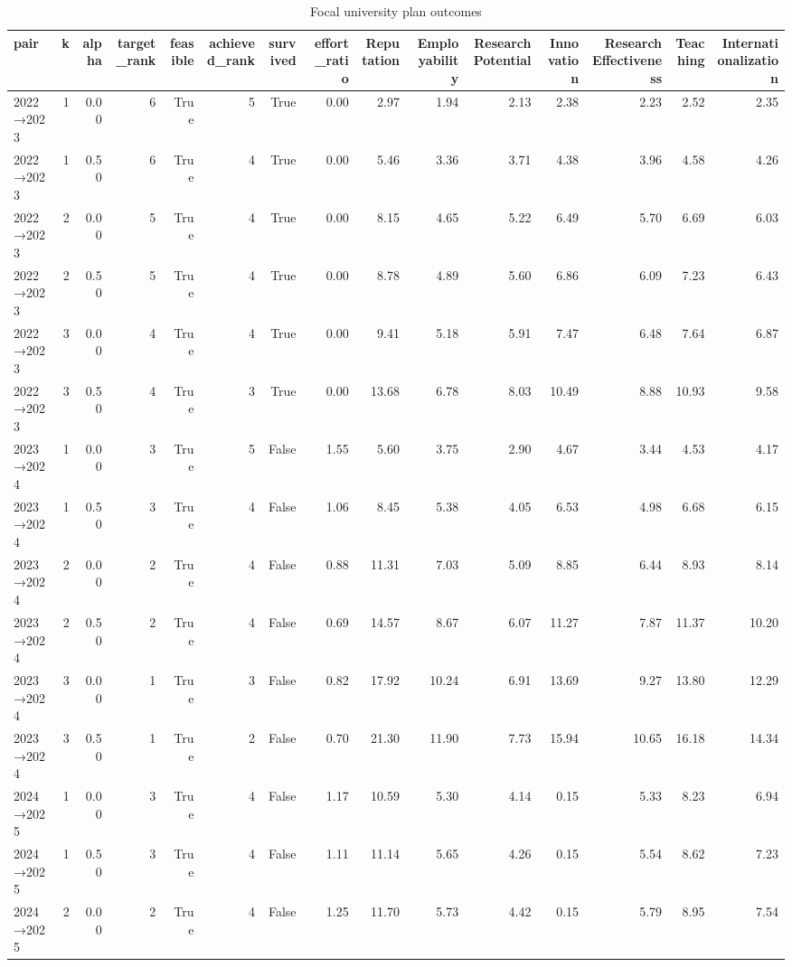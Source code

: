 \begin{table}[htbp]
\centering
\caption{Focal university plan outcomes}
\label{tab:e2-focal}
\begin{tabular}{lrrrrrrrrrrrrrr}
\toprule
pair & k & alpha & target\_rank & feasible & achieved\_rank & survived & effort\_ratio & Reputation & Employability & Research Potential & Innovation & Research Effectiveness & Teaching & Internationalization \\
\midrule
2022→2023 & 1 & 0.00 & 6 & True & 5 & True & 0.00 & 2.97 & 1.94 & 2.13 & 2.38 & 2.23 & 2.52 & 2.35 \\
2022→2023 & 1 & 0.50 & 6 & True & 4 & True & 0.00 & 5.46 & 3.36 & 3.71 & 4.38 & 3.96 & 4.58 & 4.26 \\
2022→2023 & 2 & 0.00 & 5 & True & 4 & True & 0.00 & 8.15 & 4.65 & 5.22 & 6.49 & 5.70 & 6.69 & 6.03 \\
2022→2023 & 2 & 0.50 & 5 & True & 4 & True & 0.00 & 8.78 & 4.89 & 5.60 & 6.86 & 6.09 & 7.23 & 6.43 \\
2022→2023 & 3 & 0.00 & 4 & True & 4 & True & 0.00 & 9.41 & 5.18 & 5.91 & 7.47 & 6.48 & 7.64 & 6.87 \\
2022→2023 & 3 & 0.50 & 4 & True & 3 & True & 0.00 & 13.68 & 6.78 & 8.03 & 10.49 & 8.88 & 10.93 & 9.58 \\
2023→2024 & 1 & 0.00 & 3 & True & 5 & False & 1.55 & 5.60 & 3.75 & 2.90 & 4.67 & 3.44 & 4.53 & 4.17 \\
2023→2024 & 1 & 0.50 & 3 & True & 4 & False & 1.06 & 8.45 & 5.38 & 4.05 & 6.53 & 4.98 & 6.68 & 6.15 \\
2023→2024 & 2 & 0.00 & 2 & True & 4 & False & 0.88 & 11.31 & 7.03 & 5.09 & 8.85 & 6.44 & 8.93 & 8.14 \\
2023→2024 & 2 & 0.50 & 2 & True & 4 & False & 0.69 & 14.57 & 8.67 & 6.07 & 11.27 & 7.87 & 11.37 & 10.20 \\
2023→2024 & 3 & 0.00 & 1 & True & 3 & False & 0.82 & 17.92 & 10.24 & 6.91 & 13.69 & 9.27 & 13.80 & 12.29 \\
2023→2024 & 3 & 0.50 & 1 & True & 2 & False & 0.70 & 21.30 & 11.90 & 7.73 & 15.94 & 10.65 & 16.18 & 14.34 \\
2024→2025 & 1 & 0.00 & 3 & True & 4 & False & 1.17 & 10.59 & 5.30 & 4.14 & 0.15 & 5.33 & 8.23 & 6.94 \\
2024→2025 & 1 & 0.50 & 3 & True & 4 & False & 1.11 & 11.14 & 5.65 & 4.26 & 0.15 & 5.54 & 8.62 & 7.23 \\
2024→2025 & 2 & 0.00 & 2 & True & 4 & False & 1.25 & 11.70 & 5.73 & 4.42 & 0.15 & 5.79 & 8.95 & 7.54 \\

\end{tabular}
\end{table}
